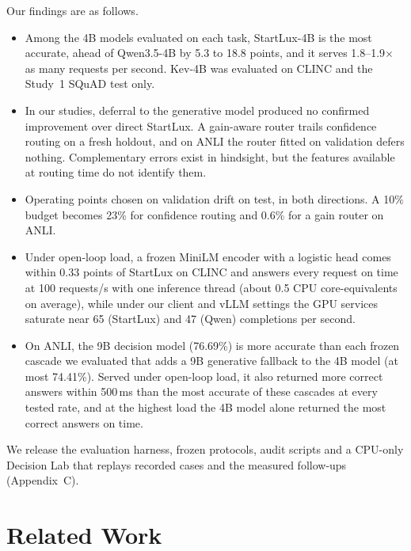 \documentclass[11pt]{article}
\begin{document}
Our findings are as follows.
\begin{itemize}
\item Among the 4B models evaluated on each task, StartLux-4B is the most accurate, ahead of Qwen3.5-4B by 5.3 to 18.8 points, and it serves 1.8--1.9$\times$ as many requests per second. Kev-4B was evaluated on CLINC and the Study~1 SQuAD test only.
\item In our studies, deferral to the generative model produced no confirmed improvement over direct StartLux. A gain-aware router trails confidence routing on a fresh holdout, and on ANLI the router fitted on validation defers nothing. Complementary errors exist in hindsight, but the features available at routing time do not identify them.
\item Operating points chosen on validation drift on test, in both directions. A 10\% budget becomes 23\% for confidence routing and 0.6\% for a gain router on ANLI.
\item Under open-loop load, a frozen MiniLM encoder with a logistic head comes within 0.33 points of StartLux on CLINC and answers every request on time at 100 requests/s with one inference thread (about 0.5 CPU core-equivalents on average), while under our client and vLLM settings the GPU services saturate near 65 (StartLux) and 47 (Qwen) completions per second.
\item On ANLI, the 9B decision model (76.69\%) is more accurate than each frozen cascade we evaluated that adds a 9B generative fallback to the 4B model (at most 74.41\%). Served under open-loop load, it also returned more correct answers within 500\,ms than the most accurate of these cascades at every tested rate, and at the highest load the 4B model alone returned the most correct answers on time.
\end{itemize}
We release the evaluation harness, frozen protocols, audit scripts and a CPU-only Decision Lab that replays recorded cases and the measured follow-ups (Appendix~C).

\section{Related Work}
\end{document}
